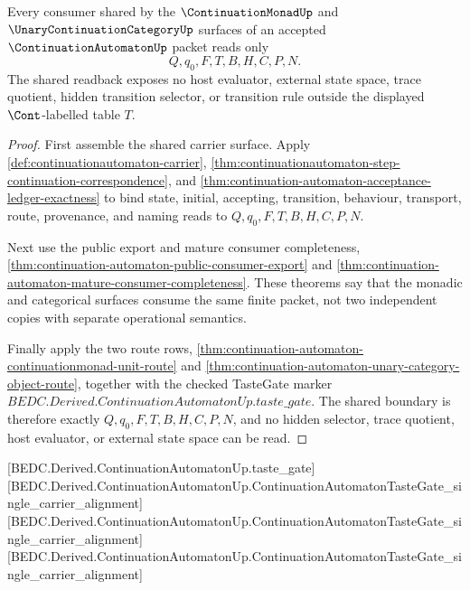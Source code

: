 \begin{theorem}
\label{thm:continuation-automaton-consumer-boundary-readback}
Every consumer shared by the $\ContinuationMonadUp$ and $\UnaryContinuationCategoryUp$ surfaces of an accepted $\ContinuationAutomatonUp$ packet reads only
$$
Q,q_0,F,T,B,H,C,P,N.
$$
The shared readback exposes no host evaluator, external state space, trace quotient, hidden transition selector, or transition rule outside the displayed $\Cont$-labelled table $T$.
\end{theorem}
\begin{proof}
First assemble the shared carrier surface. Apply \autoref{def:continuationautomaton-carrier}, \autoref{thm:continuationautomaton-step-continuation-correspondence}, and \autoref{thm:continuation-automaton-acceptance-ledger-exactness} to bind state, initial, accepting, transition, behaviour, transport, route, provenance, and naming reads to $Q,q_0,F,T,B,H,C,P,N$.

Next use the public export and mature consumer completeness, \autoref{thm:continuation-automaton-public-consumer-export} and \autoref{thm:continuation-automaton-mature-consumer-completeness}. These theorems say that the monadic and categorical surfaces consume the same finite packet, not two independent copies with separate operational semantics.

Finally apply the two route rows, \autoref{thm:continuation-automaton-continuationmonad-unit-route} and \autoref{thm:continuation-automaton-unary-category-object-route}, together with the checked TasteGate marker $BEDC.Derived.ContinuationAutomatonUp.taste\_gate$. The shared boundary is therefore exactly $Q,q_0,F,T,B,H,C,P,N$, and no hidden selector, trace quotient, host evaluator, or external state space can be read.
\end{proof}

[BEDC.Derived.ContinuationAutomatonUp.taste\_gate]
[BEDC.Derived.ContinuationAutomatonUp.ContinuationAutomatonTasteGate\_single\_carrier\_alignment]
[BEDC.Derived.ContinuationAutomatonUp.ContinuationAutomatonTasteGate\_single\_carrier\_alignment]
[BEDC.Derived.ContinuationAutomatonUp.ContinuationAutomatonTasteGate\_single\_carrier\_alignment]

